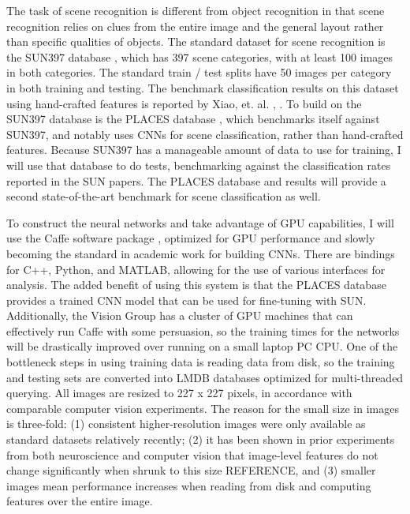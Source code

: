 \documentclass[10pt]{article}
\begin{document}
The task of scene recognition is different from object recognition in that scene recognition relies on clues from the entire image and the general layout rather than specific qualities of objects. The standard dataset for scene recognition is the SUN397 database \cite{xiao_sun_2010}, which has 397 scene categories, with at least 100 images in both categories. The standard train / test splits have 50 images per category in both training and testing. The benchmark classification results on this dataset using hand-crafted features is reported by Xiao, et. al. \cite{xiao_sun_2010}, \cite{xiao_sun_2014}. To build on the SUN397 database is the PLACES database \cite{zhou_learning_2014}, which benchmarks itself against SUN397, and notably uses CNNs for scene classification, rather than hand-crafted features. Because SUN397 has a manageable amount of data to use for training, I will use that database to do tests, benchmarking against the classification rates reported in the SUN papers. The PLACES database and results will provide a second state-of-the-art benchmark for scene classification as well.

To construct the neural networks and take advantage of GPU capabilities, I will use the Caffe software package \cite{jia_caffe:_2014}, optimized for GPU performance and slowly becoming the standard in academic work for building CNNs. There are bindings for C++, Python, and MATLAB, allowing for the use of various interfaces for analysis. The added benefit of using this system is that the PLACES database provides a trained CNN model that can be used for fine-tuning with SUN. Additionally, the Vision Group has a cluster of GPU machines that can effectively run Caffe with some persuasion, so the training times for the networks will be drastically improved over running on a small laptop PC CPU. One of the bottleneck steps in using training data is reading data from disk, so the training and testing sets are converted into LMDB databases optimized for multi-threaded querying. All images are resized to 227 x 227 pixels, in accordance with comparable computer vision experiments. The reason for the small size in images is three-fold: (1) consistent higher-resolution images were only available as standard datasets relatively recently; (2) it has been shown in prior experiments from both neuroscience and computer vision that image-level features do not change significantly when shrunk to this size REFERENCE, and (3) smaller images mean performance increases when reading from disk and computing features over the entire image.
\end{document}
